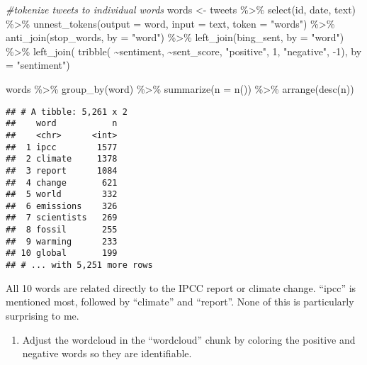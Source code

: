\documentclass[
]{article}
\newenvironment{Shaded}{\begin{snugshade}}{\end{snugshade}}
\newcommand{\AttributeTok}[1]{\textcolor[rgb]{0.77,0.63,0.00}{#1}}
\newcommand{\CommentTok}[1]{\textcolor[rgb]{0.56,0.35,0.01}{\textit{#1}}}
\newcommand{\DecValTok}[1]{\textcolor[rgb]{0.00,0.00,0.81}{#1}}
\newcommand{\FunctionTok}[1]{\textcolor[rgb]{0.00,0.00,0.00}{#1}}
\newcommand{\NormalTok}[1]{#1}
\newcommand{\OtherTok}[1]{\textcolor[rgb]{0.56,0.35,0.01}{#1}}
\newcommand{\SpecialCharTok}[1]{\textcolor[rgb]{0.00,0.00,0.00}{#1}}
\newcommand{\StringTok}[1]{\textcolor[rgb]{0.31,0.60,0.02}{#1}}
\providecommand{\tightlist}{%
  \setlength{\itemsep}{0pt}\setlength{\parskip}{0pt}}
\begin{document}
\begin{Shaded}
\begin{Highlighting}[]
\CommentTok{\#tokenize tweets to individual words}
\NormalTok{words }\OtherTok{\textless{}{-}}\NormalTok{ tweets }\SpecialCharTok{\%\textgreater{}\%}
  \FunctionTok{select}\NormalTok{(id, date, text) }\SpecialCharTok{\%\textgreater{}\%}
  \FunctionTok{unnest\_tokens}\NormalTok{(}\AttributeTok{output =}\NormalTok{ word, }\AttributeTok{input =}\NormalTok{ text, }\AttributeTok{token =} \StringTok{"words"}\NormalTok{) }\SpecialCharTok{\%\textgreater{}\%}
  \FunctionTok{anti\_join}\NormalTok{(stop\_words, }\AttributeTok{by =} \StringTok{"word"}\NormalTok{) }\SpecialCharTok{\%\textgreater{}\%}
  \FunctionTok{left\_join}\NormalTok{(bing\_sent, }\AttributeTok{by =} \StringTok{"word"}\NormalTok{) }\SpecialCharTok{\%\textgreater{}\%}
  \FunctionTok{left\_join}\NormalTok{(}
    \FunctionTok{tribble}\NormalTok{(}
      \SpecialCharTok{\textasciitilde{}}\NormalTok{sentiment, }\SpecialCharTok{\textasciitilde{}}\NormalTok{sent\_score,}
      \StringTok{"positive"}\NormalTok{, }\DecValTok{1}\NormalTok{,}
      \StringTok{"negative"}\NormalTok{, }\SpecialCharTok{{-}}\DecValTok{1}\NormalTok{),}
    \AttributeTok{by =} \StringTok{"sentiment"}\NormalTok{)}

\NormalTok{words }\SpecialCharTok{\%\textgreater{}\%} 
  \FunctionTok{group\_by}\NormalTok{(word) }\SpecialCharTok{\%\textgreater{}\%} 
  \FunctionTok{summarize}\NormalTok{(}\AttributeTok{n =} \FunctionTok{n}\NormalTok{()) }\SpecialCharTok{\%\textgreater{}\%} 
  \FunctionTok{arrange}\NormalTok{(}\FunctionTok{desc}\NormalTok{(n))}
\end{Highlighting}
\end{Shaded}

\begin{verbatim}
## # A tibble: 5,261 x 2
##    word           n
##    <chr>      <int>
##  1 ipcc        1577
##  2 climate     1378
##  3 report      1084
##  4 change       621
##  5 world        332
##  6 emissions    326
##  7 scientists   269
##  8 fossil       255
##  9 warming      233
## 10 global       199
## # ... with 5,251 more rows
\end{verbatim}

All 10 words are related directly to the IPCC report or climate change.
``ipcc'' is mentioned most, followed by ``climate'' and ``report''. None
of this is particularly surprising to me.

\begin{enumerate}
\def\labelenumi{\arabic{enumi}.}
\setcounter{enumi}{2}
\tightlist
\item
  Adjust the wordcloud in the ``wordcloud'' chunk by coloring the
  positive and negative words so they are identifiable.
\end{enumerate}
\end{document}
